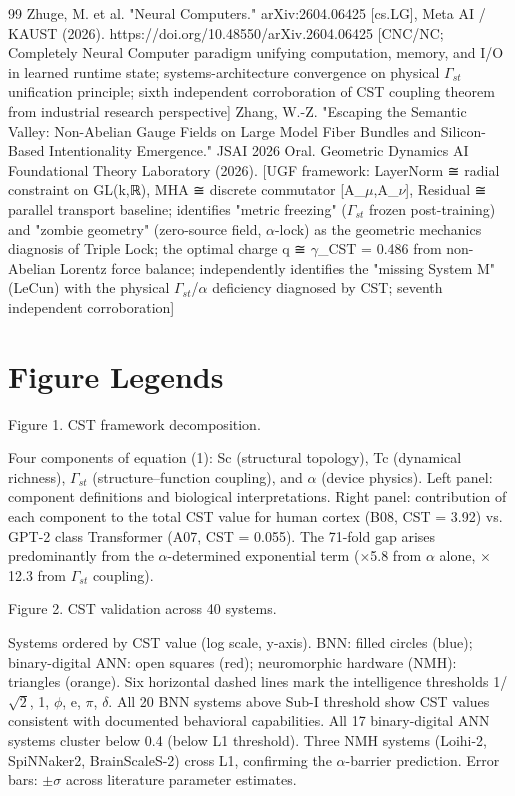 \documentclass[a4paper,12pt]{article}
\begin{document}
\begin{thebibliography}{99}
 Zhuge, M. et al. "Neural Computers." arXiv:2604.06425 [cs.LG], Meta AI / KAUST (2026). https://doi.org/10.48550/arXiv.2604.06425 [CNC/NC; Completely Neural Computer paradigm unifying computation, memory, and I/O in learned runtime state; systems-architecture convergence on physical $\Gamma_{st}$ unification principle; sixth independent corroboration of CST coupling theorem from industrial research perspective]
 Zhang, W.-Z. "Escaping the Semantic Valley: Non-Abelian Gauge Fields on Large Model Fiber Bundles and Silicon-Based Intentionality Emergence." JSAI 2026 Oral. Geometric Dynamics AI Foundational Theory Laboratory (2026). [UGF framework: LayerNorm ≅ radial constraint on GL(k,ℝ), MHA ≅ discrete commutator [A_$\mu$,A_$\nu$], Residual ≅ parallel transport baseline; identifies "metric freezing" ($\Gamma_{st}$ frozen post-training) and "zombie geometry" (zero-source field, $\alpha$-lock) as the geometric mechanics diagnosis of Triple Lock; the optimal charge q ≅ $\gamma$_CST = 0.486 from non-Abelian Lorentz force balance; independently identifies the "missing System M" (LeCun) with the physical $\Gamma_{st}$/$\alpha$ deficiency diagnosed by CST; seventh independent corroboration]
\end{thebibliography}

\section*{Figure Legends}
Figure 1. CST framework decomposition.

Four components of equation (1): Sc (structural topology), Tc (dynamical richness), $\Gamma_{st}$ (structure--function coupling), and $\alpha$ (device physics). Left panel: component definitions and biological interpretations. Right panel: contribution of each component to the total CST value for human cortex (B08, CST = 3.92) vs. GPT-2 class Transformer (A07, CST = 0.055). The 71-fold gap arises predominantly from the $\alpha$-determined exponential term ($\times$5.8 from $\alpha$ alone, $\times$12.3 from $\Gamma_{st}$ coupling).

Figure 2. CST validation across 40 systems.

Systems ordered by CST value (log scale, y-axis). BNN: filled circles (blue); binary-digital ANN: open squares (red); neuromorphic hardware (NMH): triangles (orange). Six horizontal dashed lines mark the intelligence thresholds {1/$\sqrt{2}$, 1, $\phi$, e, $\pi$, $\delta$}. All 20 BNN systems above Sub-I threshold show CST values consistent with documented behavioral capabilities. All 17 binary-digital ANN systems cluster below 0.4 (below L1 threshold). Three NMH systems (Loihi-2, SpiNNaker2, BrainScaleS-2) cross L1, confirming the $\alpha$-barrier prediction. Error bars: $\pm$$\sigma$ across literature parameter estimates.
\end{document}
